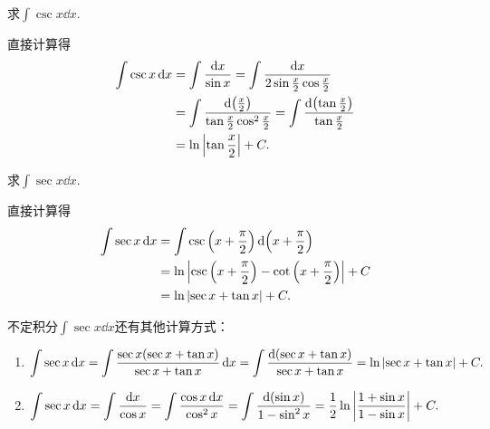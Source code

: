\begin{example}
求\(\int \csc x \dd{x}\).
\begin{solution}
直接计算得
\begin{align*}
	\int \csc x \dd{x}
	&= \int \frac{\dd{x}}{\sin x}
	= \int \frac{\dd{x}}{2 \sin\frac{x}{2} \cos\frac{x}{2}} \\
	&= \int \frac{\dd(\frac{x}{2})}{\tan\frac{x}{2} \cos^2\frac{x}{2}}
	= \int \frac{\dd(\tan\frac{x}{2})}{\tan\frac{x}{2}} \\
	&= \ln\abs{\tan\frac{x}{2}} + C.
\end{align*}
\end{solution}
\end{example}

\begin{example}
求\(\int \sec x \dd{x}\).
\begin{solution}
直接计算得\begin{align*}
	\int \sec x \dd{x}
	&= \int \csc\left(x+\frac\pi2\right) \dd(x+\frac\pi2) \\
	&= \ln\abs{\csc\left(x+\frac\pi2\right)-\cot\left(x+\frac\pi2\right)} + C \\
	&= \ln\abs{\sec x+\tan x} + C.
\end{align*}
\end{solution}
\end{example}
\begin{remark}
不定积分\(\int \sec x \dd{x}\)还有其他计算方式：
\begin{enumerate}
	\item \(\begin{aligned}[t]
		\int \sec x \dd{x}
		= \int \frac{\sec x (\sec x + \tan x)}{\sec x + \tan x} \dd{x}
		= \int \frac{\dd(\sec x + \tan x)}{\sec x + \tan x}
		= \ln\abs{\sec x + \tan x} + C.
	\end{aligned}\)

	\item \(\begin{aligned}[t]
		\int \sec x \dd{x}
		= \int \frac{\dd{x}}{\cos x}
		= \int \frac{\cos x \dd{x}}{\cos^2x}
		= \int \frac{\dd(\sin x)}{1 - \sin^2x}
		= \frac12 \ln\abs{\frac{1+\sin x}{1-\sin x}} + C.
	\end{aligned}\)
\end{enumerate}
\end{remark}

